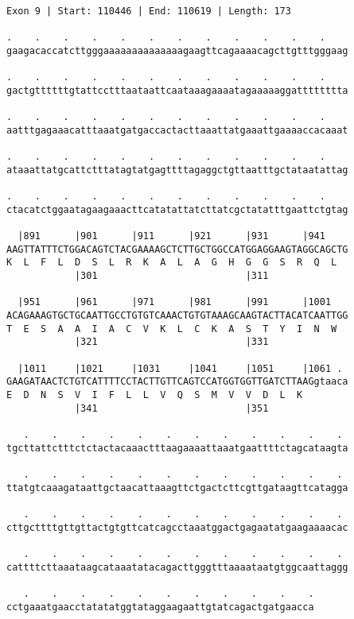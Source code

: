 \documentclass{article}
\begin{document}
\newpage
\begin{Verbatim}[fontfamily=courier]
Exon 9 | Start: 110446 | End: 110619 | Length: 173

.    .    .    .    .    .    .    .    .    .    .    .    
gaagacaccatcttgggaaaaaaaaaaaaaagaagttcagaaaacagcttgtttgggaag

.    .    .    .    .    .    .    .    .    .    .    .    
gactgttttttgtattcctttaataattcaataaagaaaatagaaaaaggatttttttta

.    .    .    .    .    .    .    .    .    .    .    .    
aatttgagaaacatttaaatgatgaccactacttaaattatgaaattgaaaaccacaaat

.    .    .    .    .    .    .    .    .    .    .    .    
ataaattatgcattctttatagtatgagttttagaggctgttaatttgctataatattag

.    .    .    .    .    .    .    .    .    .    .    .    
ctacatctggaatagaagaaacttcatatattatcttatcgctatatttgaattctgtag

  |891      |901      |911      |921      |931      |941    
AAGTTATTTCTGGACAGTCTACGAAAAGCTCTTGCTGGCCATGGAGGAAGTAGGCAGCTG
K  L  F  L  D  S  L  R  K  A  L  A  G  H  G  G  S  R  Q  L  
            |301                          |311              

  |951      |961      |971      |981      |991      |1001   
ACAGAAAGTGCTGCAATTGCCTGTGTCAAACTGTGTAAAGCAAGTACTTACATCAATTGG
T  E  S  A  A  I  A  C  V  K  L  C  K  A  S  T  Y  I  N  W  
            |321                          |331              

  |1011     |1021     |1031     |1041     |1051     |1061 . 
GAAGATAACTCTGTCATTTTCCTACTTGTTCAGTCCATGGTGGTTGATCTTAAGgtaaca
E  D  N  S  V  I  F  L  L  V  Q  S  M  V  V  D  L  K        
            |341                          |351              

   .    .    .    .    .    .    .    .    .    .    .    . 
tgcttattctttctctactacaaactttaagaaaattaaatgaattttctagcataagta

   .    .    .    .    .    .    .    .    .    .    .    . 
ttatgtcaaagataattgctaacattaaagttctgactcttcgttgataagttcatagga

   .    .    .    .    .    .    .    .    .    .    .    . 
cttgcttttgttgttactgtgttcatcagcctaaatggactgagaatatgaagaaaacac

   .    .    .    .    .    .    .    .    .    .    .    . 
cattttcttaaataagcataaatatacagacttgggtttaaaataatgtggcaattaggg

   .    .    .    .    .    .    .    .    .    .    .
cctgaaatgaacctatatatggtataggaagaattgtatcagactgatgaacca
\end{Verbatim}
\end{document}
